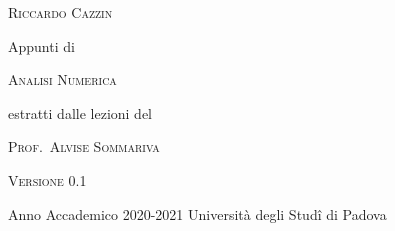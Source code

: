 \documentclass[11pt]{report}
\theoremstyle{plain}
\theoremstyle{definition}
\theoremstyle{remark}
\numberwithin{equation}{chapter}
\numberwithin{figure}{chapter}
\numberwithin{table}{chapter}
\begin{document}
	\begin{titlepage}
		\begin{center}
			\begin{LARGE}
				\textsc{Riccardo Cazzin}
			\end{LARGE}
		\end{center}
		
		\vspace{4.5em}
		
		\begin{center}
			\begin{large}
				Appunti di
			\end{large}
			
			\vspace{1.8em}
			
			\begin{huge}
				\textsc{Analisi Numerica}
			\end{huge}
		\end{center}
		
		\vfill
		
		\begin{center}
			\begin{large}
				estratti dalle lezioni del
			\end{large}
			
			\vspace{1em}
			
			\begin{LARGE}
				\textsc{Prof.\ Alvise Sommariva}
			\end{LARGE}
		\end{center}
		
		\vfill
		
		\begin{center}
			\begin{large}
				\textsc{Versione 0.1}
			\end{large}
		\end{center}
		
		\vfill
		
		\noindent Anno Accademico 2020-2021 \hfill Università degli Studî di Padova
	\end{titlepage}
	
	\tableofcontents
	
	
	
	
	
	
	
	
	
\end{document}

